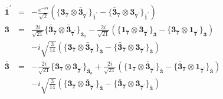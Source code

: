 \documentclass[english]{article}
\newcommand{\subcg}[3]{\big\{ {#1}\otimes{#2}\big\}^{}_{#3}}
\newcommand{\rep}[1]{\mathbf{#1}}
\begin{document}
\begin{itemize}
\begin{eqnarray*}
\\
\rep{\bar{1}^{\prime}} &=& -\frac{e^{-i \alpha }}{\sqrt{2}}\left(\subcg{\rep{3}_{\rep{7}}}{\rep{\bar{3}}_{\rep{7^{\prime}}}}{\rep{\bar{1}^{\prime}}}-\subcg{\rep{\bar{3}}_{\rep{7}}}{\rep{3}_{\rep{7^{\prime}}}}{\rep{\bar{1}^{\prime}}}\right)
\\
\rep{3} &=& \frac{2 i}{\sqrt{21}}\subcg{\rep{\bar{3}}_{\rep{7}}}{\rep{\bar{3}}_{\rep{7^{\prime}}}}{\rep{3}_{a}}-\frac{2 i}{\sqrt{21}}\left(\subcg{\rep{1}_{\rep{7}}}{\rep{3}_{\rep{7^{\prime}}}}{\rep{3}}-\subcg{\rep{3}_{\rep{7}}}{\rep{1}_{\rep{7^{\prime}}}}{\rep{3}}\right) \\ 
 & & -i \sqrt{\frac{3}{14}}\left(\subcg{\rep{3}_{\rep{7}}}{\rep{\bar{3}}_{\rep{7^{\prime}}}}{\rep{3}}-\subcg{\rep{\bar{3}}_{\rep{7}}}{\rep{3}_{\rep{7^{\prime}}}}{\rep{3}}\right)
\\
\rep{\bar{3}} &=& -\frac{2 i}{\sqrt{21}}\subcg{\rep{3}_{\rep{7}}}{\rep{3}_{\rep{7^{\prime}}}}{\rep{\bar{3}}_{a}}+\frac{2 i}{\sqrt{21}}\left(\subcg{\rep{1}_{\rep{7}}}{\rep{\bar{3}}_{\rep{7^{\prime}}}}{\rep{\bar{3}}}-\subcg{\rep{\bar{3}}_{\rep{7}}}{\rep{1}_{\rep{7^{\prime}}}}{\rep{\bar{3}}}\right) \\ 
 & & -i \sqrt{\frac{3}{14}}\left(\subcg{\rep{3}_{\rep{7}}}{\rep{\bar{3}}_{\rep{7^{\prime}}}}{\rep{\bar{3}}}-\subcg{\rep{\bar{3}}_{\rep{7}}}{\rep{3}_{\rep{7^{\prime}}}}{\rep{\bar{3}}}\right)
\end{eqnarray*}
\end{itemize}
\end{document}
